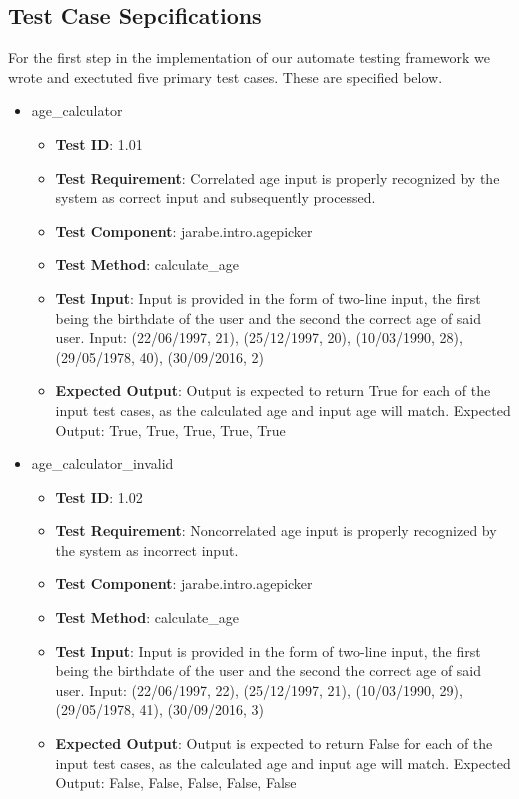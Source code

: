 \documentclass{article}
\begin{document}
\subsection{Test Case Sepcifications}
For the first step in the implementation of our automate testing framework we wrote and exectuted five primary test cases. These are specified below.
\begin{itemize}[noitemsep]
\item age\_calculator
\begin{itemize}[noitemsep,topsep=0pt]
\item \textbf{Test ID}: 1.01
\item \textbf{Test Requirement}: Correlated age input is properly recognized by the system as correct input and subsequently processed.
\item \textbf{Test Component}: jarabe.intro.agepicker
\item \textbf{Test Method}: calculate\_age
\item \textbf{Test Input}: Input is provided in the form of two-line input, the first being the birthdate of the user and the second the correct age of said user. Input: (22/06/1997, 21), (25/12/1997, 20), (10/03/1990, 28), (29/05/1978, 40), (30/09/2016, 2)
\item \textbf{Expected Output}: Output is expected to return True for each of the input test cases, as the calculated age and input age will match. Expected Output: True, True, True, True, True
\end{itemize}
\item age\_calculator\_invalid
\begin{itemize}[noitemsep,topsep=0pt]
\item \textbf{Test ID}: 1.02
\item \textbf{Test Requirement}: Noncorrelated age input is properly recognized by the system as incorrect input.
\item \textbf{Test Component}: jarabe.intro.agepicker
\item \textbf{Test Method}: calculate\_age
\item \textbf{Test Input}: Input is provided in the form of two-line input, the first being the birthdate of the user and the second the correct age of said user. Input: (22/06/1997, 22), (25/12/1997, 21), (10/03/1990, 29), (29/05/1978, 41), (30/09/2016, 3)
\item \textbf{Expected Output}: Output is expected to return False for each of the input test cases, as the calculated age and input age will match. Expected Output: False, False, False, False, False

\end{itemize}
\end{itemize}
\end{document}
